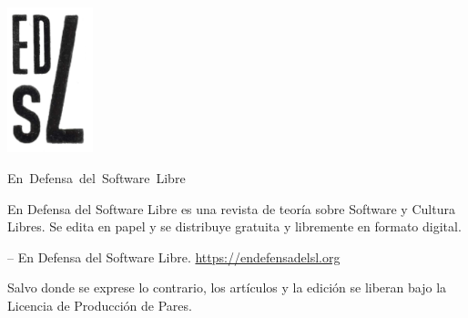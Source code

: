     \newpage
    \thispagestyle{empty}

    \begin{flushleft}

    \includegraphics[width=2.5cm]{images/logo_edsl.png}



    \hbox{\Large{En Defensa del Software Libre}}

    En Defensa del Software Libre es una revista de teoría sobre
    Software y Cultura Libres. Se edita en papel y se distribuye
    gratuita y libremente en formato digital.

    \vfill
    \copyleft  \the\year -- En Defensa del Software Libre.
    \url{https://endefensadelsl.org}

    Salvo donde se exprese lo contrario, los artículos y la edición se
    liberan bajo la Licencia de Producción de Pares.

    \end{flushleft}
   \newpage

